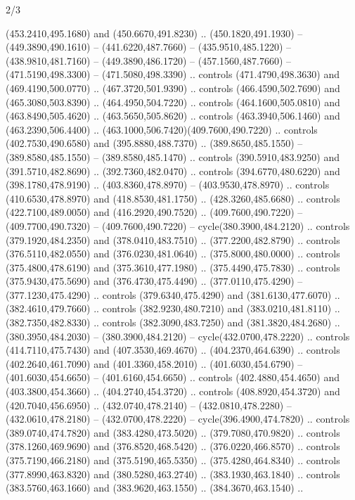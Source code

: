 \begin{flagdescription}{2/3}
\begin{scope}[xshift=0.5\flaglength]
\begin{scope}[scale=0.00209\flagwidth,yshift=170mm,xshift=-360]
\begin{scope}[y=-0.8pt, x=0.8pt, inner sep=0pt, outer sep=0pt]
\begin{scope}[cm={{-1.0,0.0,0.0,1.0,(900.0,0.0)}}]
  (453.2410,495.1680) and (450.6670,491.8230) .. (450.1820,491.1930) --
  (449.3890,490.1610) -- (441.6220,487.7660) -- (435.9510,485.1220) --
  (438.9810,481.7160) -- (449.3890,486.1720) -- (457.1560,487.7660) --
  (471.5190,498.3300) -- (471.5080,498.3390) .. controls (471.4790,498.3630) and
  (469.4190,500.0770) .. (467.3720,501.9390) .. controls (466.4590,502.7690) and
  (465.3080,503.8390) .. (464.4950,504.7220) .. controls (464.1600,505.0810) and
  (463.8490,505.4620) .. (463.5650,505.8620) .. controls (463.3940,506.1460) and
  (463.2390,506.4400) .. (463.1000,506.7420)(409.7600,490.7220) .. controls
  (402.7530,490.6580) and (395.8880,488.7370) .. (389.8650,485.1550) --
  (389.8580,485.1550) -- (389.8580,485.1470) .. controls (390.5910,483.9250) and
  (391.5710,482.8690) .. (392.7360,482.0470) .. controls (394.6770,480.6220) and
  (398.1780,478.9190) .. (403.8360,478.8970) -- (403.9530,478.8970) .. controls
  (410.6530,478.8970) and (418.8530,481.1750) .. (428.3260,485.6680) .. controls
  (422.7100,489.0050) and (416.2920,490.7520) .. (409.7600,490.7220) --
  (409.7700,490.7320) -- (409.7600,490.7220) -- cycle(380.3900,484.2120) ..
  controls (379.1920,484.2350) and (378.0410,483.7510) .. (377.2200,482.8790) ..
  controls (376.5110,482.0550) and (376.0230,481.0640) .. (375.8000,480.0000) ..
  controls (375.4800,478.6190) and (375.3610,477.1980) .. (375.4490,475.7830) ..
  controls (375.9430,475.5690) and (376.4730,475.4490) .. (377.0110,475.4290) --
  (377.1230,475.4290) .. controls (379.6340,475.4290) and (381.6130,477.6070) ..
  (382.4610,479.7660) .. controls (382.9230,480.7210) and (383.0210,481.8110) ..
  (382.7350,482.8330) .. controls (382.3090,483.7250) and (381.3820,484.2680) ..
  (380.3950,484.2030) -- (380.3900,484.2120) -- cycle(432.0700,478.2220) ..
  controls (414.7110,475.7430) and (407.3530,469.4670) .. (404.2370,464.6390) ..
  controls (402.2640,461.7090) and (401.3360,458.2010) .. (401.6030,454.6790) --
  (401.6030,454.6650) -- (401.6160,454.6650) .. controls (402.4880,454.4650) and
  (403.3800,454.3660) .. (404.2740,454.3720) .. controls (408.8920,454.3720) and
  (420.7040,456.6950) .. (432.0740,478.2140) -- (432.0810,478.2280) --
  (432.0610,478.2180) -- (432.0700,478.2220) -- cycle(396.4900,474.7820) ..
  controls (389.0740,474.7820) and (383.4280,473.5020) .. (379.7080,470.9820) ..
  controls (378.1260,469.9690) and (376.8520,468.5420) .. (376.0220,466.8570) ..
  controls (375.7190,466.2180) and (375.5190,465.5350) .. (375.4280,464.8340) ..
  controls (377.8990,463.8320) and (380.5280,463.2740) .. (383.1930,463.1840) ..
  controls (383.5760,463.1660) and (383.9620,463.1550) .. (384.3670,463.1540) ..

\end{scope}
\end{scope}
\end{scope}
\end{scope}
\end{flagdescription}

